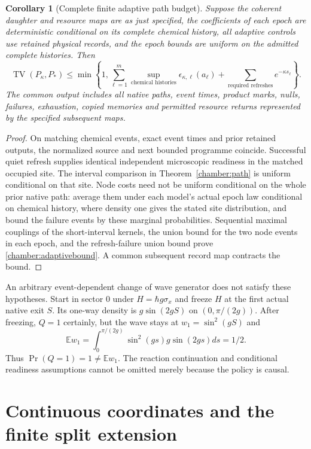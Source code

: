 \documentclass[11pt,oneside,openany]{book}
\newtheorem{corollary}[theorem]{Corollary}
\theoremstyle{definition}
\theoremstyle{remark}\newtheorem{remark}[theorem]{Remark}
\begin{document}
\begin{corollary}[Complete finite adaptive path budget]
\label{chamber:adaptive}
Suppose the coherent daughter and resource maps are as just specified, the coefficients of each epoch are deterministic conditional on its complete chemical history, all adaptive controls use retained physical records, and the epoch bounds are uniform on the admitted complete histories. Then
\begin{equation}
 \operatorname{TV}(P_\kappa,P_*)\le
 \min\left\{1,\sum_{\ell=1}^m
       \sup_{\text{chemical histories}}\epsilon_{\kappa,\ell}(a_\ell)
       +\sum_{\text{required refreshes}}e^{-\kappa s_\ell}\right\}.
 \label{chamber:adaptivebound}
\end{equation}
The common output includes all native paths, event times, product marks, nulls, failures, exhaustion, copied memories and permitted resource returns represented by the specified subsequent maps.
\end{corollary}
\begin{proof}
On matching chemical events, exact event times and prior retained outputs, the normalized source and next bounded programme coincide. Successful quiet refresh supplies identical independent microscopic readiness in the matched occupied site. The interval comparison in Theorem~\ref{chamber:path} is uniform conditional on that site. Node costs need not be uniform conditional on the whole prior native path: average them under each model's actual epoch law conditional on chemical history, where density one gives the stated site distribution, and bound the failure events by these marginal probabilities. Sequential maximal couplings of the short-interval kernels, the union bound for the two node events in each epoch, and the refresh-failure union bound prove \eqref{chamber:adaptivebound}. A common subsequent record map contracts the bound.
\end{proof}

An arbitrary event-dependent change of wave generator does not satisfy these hypotheses. Start in sector 0 under $H=\hbar g\sigma_x$ and freeze $H$ at the first actual native exit $S$. Its one-way density is $g\sin(2gS)$ on $(0,\pi/(2g))$. After freezing, $Q=1$ certainly, but the wave stays at $w_1=\sin^2(gS)$ and
\[
 \mathbb E w_1=\int_0^{\pi/(2g)}\sin^2(gs)g\sin(2gs)ds=1/2.
\]
Thus $\Pr(Q=1)=1\ne\mathbb Ew_1$. The reaction continuation and conditional readiness assumptions cannot be omitted merely because the policy is causal.

\section{Continuous coordinates and the finite split extension}
\end{document}
